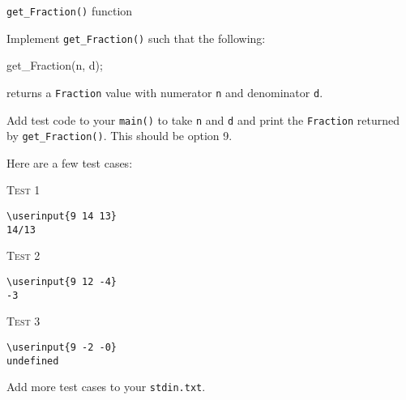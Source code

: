 \verb!get_Fraction()! function

Implement \verb!get_Fraction()! such that the following:
\begin{console}
get_Fraction(n, d);
\end{console}
returns a \verb!Fraction! value with numerator \verb!n! and denominator
\verb!d!.

Add test code to your \verb!main()! to take \verb!n! and \verb!d! and print
the \verb!Fraction! returned by \verb!get_Fraction()!.
This should be option 9.

Here are a few test cases:

\textsc{Test 1}\vspace{-6pt}
\begin{Verbatim}[frame=single, commandchars=\\\{\}]
\userinput{9 14 13}
14/13
\end{Verbatim}

\textsc{Test 2}\vspace{-6pt}
\begin{Verbatim}[frame=single, commandchars=\\\{\}]
\userinput{9 12 -4}
-3
\end{Verbatim}

\textsc{Test 3}\vspace{-6pt}
\begin{Verbatim}[frame=single, commandchars=\\\{\}]
\userinput{9 -2 -0}
undefined
\end{Verbatim}

Add more test cases to your \verb!stdin.txt!.

